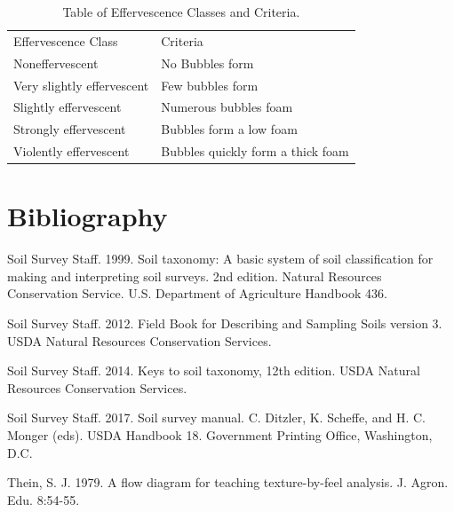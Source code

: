 \documentclass[letterpaper, 12pt]{article}
\begin{document}
\begin{table}[!htbp]
\centering
\caption{Table of Effervescence Classes and Criteria.}
\label{tab:effervescenceclasses}
\begin{tabular}{ll}
\hline
Effervescence Class         & Criteria                          \\ \hhline{==}
Noneffervescent             & No Bubbles form                   \\
Very slightly effervescent  & Few bubbles form                  \\
Slightly effervescent       & Numerous bubbles foam             \\
Strongly effervescent       & Bubbles form a low foam           \\
Violently effervescent      & Bubbles quickly form a thick foam \\
\hline
\end{tabular}
\end{table}



\newpage
\quad %
\newpage

\section*{Bibliography}

Soil Survey Staff. 1999. Soil taxonomy: A basic system of soil classification for making and interpreting soil surveys. 2nd edition. Natural Resources Conservation Service. U.S. Department of Agriculture Handbook 436.

Soil Survey Staff. 2012. Field Book for Describing and Sampling Soils version 3.  USDA Natural Resources Conservation Services.

Soil Survey Staff. 2014. Keys to soil taxonomy, 12th edition. USDA Natural Resources Conservation Services.

Soil Survey Staff. 2017. Soil survey manual. C. Ditzler, K. Scheffe, and H. C. Monger (eds). USDA Handbook 18. Government Printing Office, Washington, D.C.

Thein, S. J. 1979. A flow diagram for teaching texture-by-feel analysis. J. Agron. Edu. 8:54-55.
\end{document}
